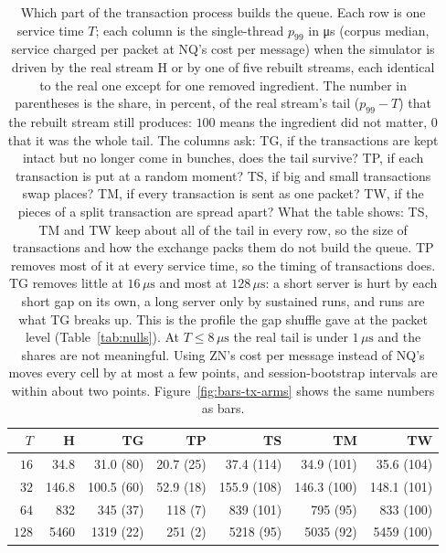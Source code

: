 \documentclass[11pt]{article}
\begin{document}
\begin{table}[H]
\centering
\small
\begin{tabular}{@{}r r rrrrr@{}}
\toprule
$T$ & H & TG & TP & TS & TM & TW \\
\midrule
$16$  &   34.8 &   31.0 (80) &   20.7 (25) &   37.4 (114) &   34.9 (101) &   35.6 (104) \\
$32$  &  146.8 &  100.5 (60) &   52.9 (18) &  155.9 (108) &  146.3 (100) &  148.1 (101) \\
$64$  &  832   &  345 (37)   &  118 (7)    &  839 (101)   &  795 (95)    &  833 (100) \\
$128$ & 5460   & 1319 (22)   &  251 (2)    & 5218 (95)    & 5035 (92)    & 5459 (100) \\
\bottomrule
\end{tabular}
\caption{Which part of the transaction process builds the queue. Each row is one service time
$T$; each column is the single-thread $p_{99}$ in \si{\micro\second} (corpus median,
service charged per packet at NQ's cost per message) when the simulator is driven by the
real stream H or by one of five rebuilt streams, each identical to the real one except
for one removed ingredient. The number in parentheses is the share, in percent, of the
real stream's tail ($p_{99} - T$) that the rebuilt stream still produces: $100$ means the
ingredient did not matter, $0$ that it was the whole tail. The columns ask: TG, if the
transactions are kept intact but no longer come in bunches, does the tail survive? TP, if
each transaction is put at a random moment? TS, if big and small transactions swap
places? TM, if every transaction is sent as one packet? TW, if the pieces of a split
transaction are spread apart? What the table shows: TS, TM and TW keep about all of the
tail in every row, so the size of transactions and how the exchange packs them do not
build the queue. TP removes most of it at every service time, so the timing of
transactions does. TG removes little at $16\,\mu\mathrm{s}$ and most at
$128\,\mu\mathrm{s}$: a short server is hurt by each short gap on its own, a long server
only by sustained runs, and runs are what TG breaks up. This is the profile the gap
shuffle gave at the packet level (Table~\ref{tab:nulls}). At $T \le 8\,\mu\mathrm{s}$ the
real tail is under $1\,\mu\mathrm{s}$ and the shares are not meaningful. Using ZN's cost per
message instead of NQ's moves every cell by at most a few points, and session-bootstrap
intervals are within about two points. Figure~\ref{fig:bars-tx-arms} shows the same numbers as bars.}
\label{tab:tx-arms}
\end{table}
\end{document}
